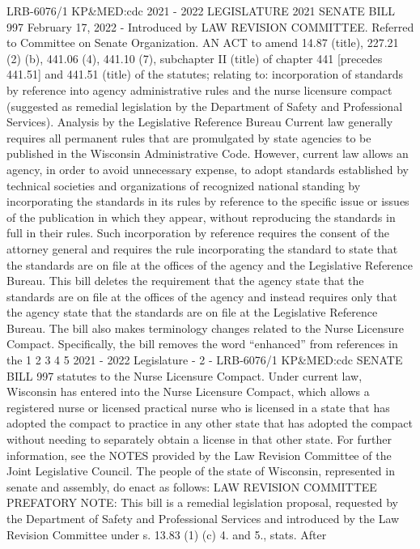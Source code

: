 LRB-6076/1
KP&MED:cdc
2021 - 2022 LEGISLATURE
2021 SENATE BILL 997
February 17, 2022 - Introduced by LAW REVISION COMMITTEE. Referred to
Committee on Senate Organization.
AN ACT to amend 14.87 (title), 227.21 (2) (b), 441.06 (4), 441.10 (7), subchapter
II (title) of chapter 441 [precedes 441.51] and 441.51 (title) of the statutes;
relating to: incorporation of standards by reference into agency
administrative rules and the nurse licensure compact (suggested as remedial
legislation by the Department of Safety and Professional Services).
Analysis by the Legislative Reference Bureau
Current law generally requires all permanent rules that are promulgated by
state agencies to be published in the Wisconsin Administrative Code. However,
current law allows an agency, in order to avoid unnecessary expense, to adopt
standards established by technical societies and organizations of recognized
national standing by incorporating the standards in its rules by reference to the
specific issue or issues of the publication in which they appear, without reproducing
the standards in full in their rules. Such incorporation by reference requires the
consent of the attorney general and requires the rule incorporating the standard to
state that the standards are on file at the offices of the agency and the Legislative
Reference Bureau.
This bill deletes the requirement that the agency state that the standards are
on file at the offices of the agency and instead requires only that the agency state that
the standards are on file at the Legislative Reference Bureau.
The bill also makes terminology changes related to the Nurse Licensure
Compact. Specifically, the bill removes the word “enhanced” from references in the
1
2
3
4
5
2021 - 2022 Legislature - 2 - LRB-6076/1
KP&MED:cdc
 SENATE BILL 997
statutes to the Nurse Licensure Compact. Under current law, Wisconsin has entered
into the Nurse Licensure Compact, which allows a registered nurse or licensed
practical nurse who is licensed in a state that has adopted the compact to practice
in any other state that has adopted the compact without needing to separately obtain
a license in that other state.
For further information, see the NOTES provided by the Law Revision
Committee of the Joint Legislative Council.
The people of the state of Wisconsin, represented in senate and assembly, do
enact as follows:
LAW REVISION COMMITTEE PREFATORY NOTE: This bill is a remedial legislation
proposal, requested by the Department of Safety and Professional Services and
introduced by the Law Revision Committee under s. 13.83 (1) (c) 4. and 5., stats. After
